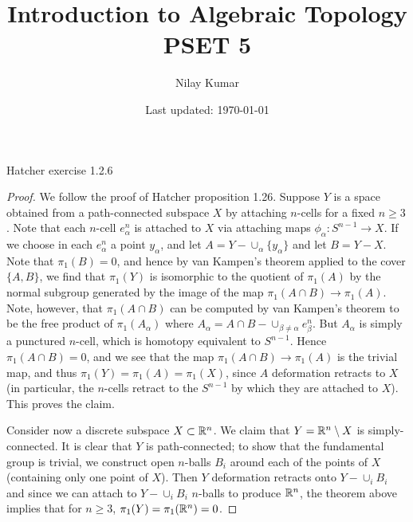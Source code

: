 \documentclass{../../mathnotes}
\title{Introduction to Algebraic Topology PSET 5}
\author{Nilay Kumar}
\date{Last updated: \today}
\begin{document}
\maketitle

\begin{prop}
    Hatcher exercise 1.2.6
\end{prop}
\begin{proof}
    We follow the proof of Hatcher proposition 1.26. Suppose $Y$ is a space obtained
    from a path-connected subspace $X$ by attaching $n$-cells for a fixed $n\geq 3$.
    Note that each $n$-cell $e^n_\alpha$ is attached to $X$ via attaching maps
    $\phi_\alpha:S^{n-1}\to X$. If we choose in each $e^n_\alpha$ a point $y_\alpha$,
    and let $A=Y-\cup_\alpha\{y_\alpha\}$ and let $B=Y-X$. Note that $\pi_1(B)=0$, and
    hence by van Kampen's theorem applied to the cover $\{A,B\}$, we find that $\pi_1(Y)$
    is isomorphic to the quotient of $\pi_1(A)$ by the normal subgroup generated by the
    image of the map $\pi_1(A\cap B)\to\pi_1(A)$. Note, however, that $\pi_1(A\cap B)$
    can be computed by van Kampen's theorem to be the free product of $\pi_1(A_\alpha)$
    where $A_\alpha=A\cap B-\cup_{\beta\neq\alpha}e^n_\beta$. But $A_\alpha$ is simply
    a punctured $n$-cell, which is homotopy equivalent to $S^{n-1}$. Hence $\pi_1(A\cap B)=0$,
    and we see that the map $\pi_1(A\cap B)\to\pi_1(A)$ is the trivial map, and thus
    $\pi_1(Y)=\pi_1(A)=\pi_1(X)$, since $A$ deformation retracts to $X$ (in particular, the
    $n$-cells retract to the $S^{n-1}$ by which they are attached to $X$). This proves the claim.

    Consider now a discrete subspace $X\subset \mathbb{R}^n$. We claim that $Y=\mathbb{R}^n\setminus X$ is
    simply-connected. It is clear that $Y$ is path-connected; to show that the fundamental
    group is trivial, we construct open $n$-balls $B_i$ around each of the points of $X$
    (containing only one point of $X$). Then $Y$ deformation retracts onto $Y-\cup_i B_i$
    and since we can attach to $Y-\cup_i B_i$ $n$-balls to produce $\mathbb{R}^n$, the theorem above
    implies that for $n\geq 3$, $\pi_1(Y)=\pi_1(\mathbb{R}^n)=0$.
\end{proof}
\end{document}
